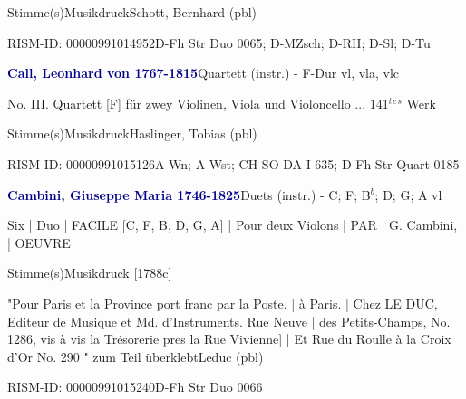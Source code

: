 \documentclass[twocolumn]{book}
\begin{document}
\par \textcolor{darkblue}{}  Stimme(s)\newline Musikdruck\newline Schott, Bernhard  (pbl)
\par RISM-ID: 00000991014952\newline D-Fh  Str Duo 0065; D-MZsch; D-RH; D-Sl; D-Tu
\par \vspace{7pt} \textcolor{darkblue}{\textbf{Call, Leonhard von  1767-1815}}\hfillplus{\textbf{[255]}}\newline Quartett (instr.) - F-Dur vl, vla, vlc
\par \begin{itshape}No. III. Quartett [F] für zwey Violinen, Viola und Violoncello ... 141$^t$$^e$$^s$ Werk\end{itshape} 
\par \textcolor{darkblue}{}  Stimme(s)\newline Musikdruck\newline Haslinger, Tobias  (pbl)
\par RISM-ID: 00000991015126\newline A-Wn; A-Wst; CH-SO  DA I 635; D-Fh  Str Quart 0185
\par \vspace{7pt} \textcolor{darkblue}{\textbf{Cambini, Giuseppe Maria  1746-1825}}\hfillplus{\textbf{[256]}}\newline Duets (instr.) - C; F; B$^b$; D; G; A vl
\par \begin{itshape}Six | Duo | FACILE [C, F, B, D, G, A] | Pour deux Violons | PAR | G. Cambini, | OEUVRE\end{itshape} 
\par \textcolor{darkblue}{}  Stimme(s)\newline Musikdruck  [1788c]
\par "Pour Paris et la Province port franc par la Poste. | à Paris. | Chez LE DUC, Editeur de Musique et Md. d'Instruments. Rue Neuve | des Petits-Champs, No. 1286, vis à vis la Trésorerie pres la Rue Vivienne] | Et Rue du Roulle à la Croix d'Or No. 290 " zum Teil überklebt\newline Leduc  (pbl)
\par RISM-ID: 00000991015240\newline D-Fh  Str Duo 0066
\end{document}
